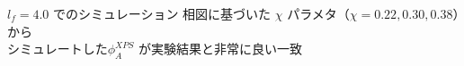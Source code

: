 \documentclass[unicode,12pt]{beamer}%
\begin{document}
\begin{frame}
\begin{columns}
\begin{column}{6.0cm}
\begin{figure}[htbp]
\begin{center}
			\end{center}
		\end{figure}
	\end{column}
\end{columns}

\begin{alertblock}{$l_f = 4.0$ でのシミュレーション}
相図に基づいた $\chi$ パラメタ（$\chi = 0.22, 0.30, 0.38$）から\\シミュレートした$\phi_A^{XPS}$ が実験結果と非常に良い一致
\end{alertblock}
\end{frame}
\end{document}
